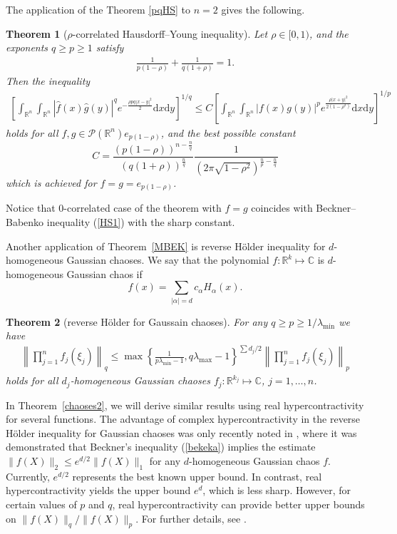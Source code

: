\documentclass[9pt, a4paper]{amsart}
\newcommand{\1}{{\chi_{}}}%
\newtheorem{theorem}{Theorem}
\numberwithin{equation}{section}
\begin{document}
    
The application of the Theorem \ref{pqHS} to $n=2$ gives the following.
\begin{theorem}[$\rho$-correlated Hausdorff--Young inequality]\label{rhoHSI}
Let $\rho \in [0,1)$, and the exponents $q\geq p \geq 1$ satisfy 
\begin{align}\label{rhoHSIloc}
    \frac{1}{p(1-\rho)}+\frac{1}{q(1+\rho)}=1.
\end{align}
Then the inequality
\begin{align*}    \left[\int_{\mathbb{R}^{n}}\int_{\mathbb{R}^{n}}|\widehat{f}(x)\widehat{g}(y) |^{q} e^{-\frac{\rho p q|x-y|^{2}}{2}}\mathrm{d}x\mathrm{d}y  \right]^{1/q} \leq C\left[\int_{\mathbb{R}^{n}}\int_{\mathbb{R}^{n}}\left|f(x)g(y) \right|^{p}e^{\frac{\rho|x+y|^{2}}{2(1-\rho^{2})}}\mathrm{d}x\mathrm{d}y \right]^{1/p}
\end{align*}
holds for all  $f,g \in \mathcal{P}(\mathbb{R}^{n})e_{p(1-\rho)}$, and the best possible constant 
$$
C = \frac{(p(1-\rho))^{n-\frac{n}{q}}}{(q(1+\rho))^{\frac{n}{q}}} \frac{1}{\left(2\pi \sqrt{1-\rho^{2}}\right)^{\frac{n}{p}-\frac{n}{q}}}
$$
which is achieved for $f=g=e_{p(1-\rho)}$.  
\end{theorem}

Notice that $0$-correlated case of the theorem with $f=g$ coincides with Beckner--Babenko inequality (\ref{HS1}) with the sharp constant. 

\vskip1cm
Another application of Theorem~\ref{MBEK} is reverse H\"older inequality for $d$-homogeneous Gaussian chaoses. We say that the polynomial $f : \mathbb{R}^{k}\mapsto \mathbb{C}$ is $d$-homogeneous Gaussian chaos if 
$$
f(x) = \sum_{|\alpha|=d}c_{\alpha}H_{\alpha}(x).
$$

\begin{theorem}[reverse H\"older for Gaussain chaoses]\label{chaoses}
 For any $q\geq p \geq 1/\lambda_{\min}$ we have 
  \begin{align*}
      \left\|\prod_{j=1}^{n}f_{j}(\xi_{j})\right\|_{q}\leq \max\left\{ \frac{1}{p\lambda_{\min}-1}, q\lambda_{\max}-1 \right\}^{\sum d_{j}/2}\left\|\prod_{j=1}^{n}f_{j}(\xi_{j})\right\|_{p}
  \end{align*}
  holds for all $d_{j}$-homogeneous Gaussian chaoses $f_{j} :\mathbb{R}^{k_{j}}\mapsto \mathbb{C}$, $j=1, \ldots, n$.
\end{theorem}
In Theorem~\ref{chaoses2}, we will derive similar results using real hypercontractivity for several functions. The advantage of complex hypercontractivity in the reverse Hölder inequality for Gaussian chaoses was only recently noted in \cite{IvTk}, where it was demonstrated that Beckner's inequality (\ref{bekeka}) implies the estimate $\|f(X)\|_{2} \leq e^{d/2} \|f(X)\|_{1}$ for any $d$-homogeneous Gaussian chaos $f$. Currently, $e^{d/2}$ represents the best known upper bound. In contrast, real hypercontractivity yields the upper bound $e^{d}$, which is less sharp. However, for certain values of $p$ and $q$, real hypercontractivity can provide better upper bounds on $\|f(X)\|_{q}/\|f(X)\|_{p}$. For further details, see \cite{IvTk}. 
\end{document}
